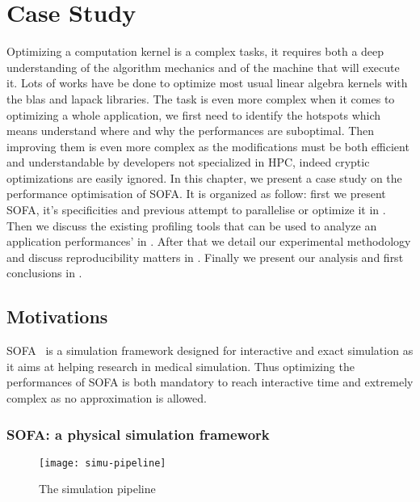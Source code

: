 \chapter{Case Study}
\label{chap:perf}

Optimizing a computation kernel is a complex tasks, it requires both a deep
understanding of the algorithm mechanics and of the machine that will execute
it. Lots of works have be done to optimize most usual linear algebra kernels
with the blas and lapack libraries.  The task is even more
complex when it comes to optimizing a whole application, we first need to
identify the hotspots which means understand where and why the performances
are suboptimal. Then improving them is even more complex as the modifications
must be both efficient and understandable by developers not specialized in
\gls{HPC}, indeed cryptic optimizations are easily ignored. 
In this chapter, we present a case study on the performance optimisation of
\gls{SOFA}. It is organized as follow: first we present \gls{SOFA}, it's
specificities and previous attempt to parallelise or optimize it in
. Then we discuss the existing profiling tools that can
be used to analyze an application performances' in . After
that we detail our experimental methodology and discuss reproducibility
matters in . Finally we present our analysis and first
conclusions in .

\section{Motivations}
\label{sec:motivations}


\gls{SOFA}~\cite{Allard07SOFA} is a simulation framework designed for
interactive and exact simulation as it aims at helping research in medical
simulation. Thus optimizing the performances of \gls{SOFA} is both mandatory
to reach interactive time and extremely complex as no approximation is
allowed.

\subsection{SOFA: a physical simulation framework}

\begin{figure}[htb]
    \centering
    \texttt{[image: simu-pipeline]}
    \caption[The simulation pipeline]{The simulation pipeline}
    \label{fig:simu-pipeline}
\end{figure}


